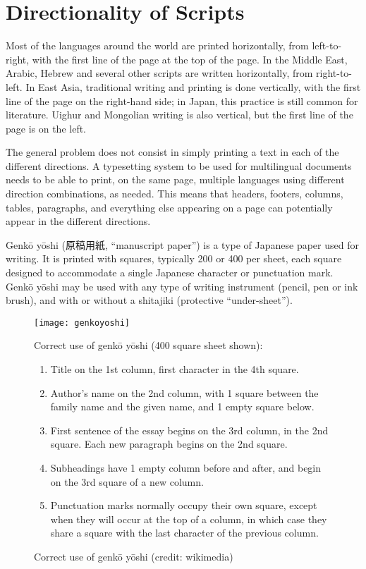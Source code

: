 \chapter{Directionality of Scripts}

Most of the languages around the world are printed horizontally, from left-to-right, with the first
line of the page at the top of the page. In the Middle East, Arabic, Hebrew and several other scripts are
written horizontally, from right-to-left. In East Asia, traditional writing and printing is done vertically,
with the first line of the page on the right-hand side; in Japan, this practice is still common for literature.
Uighur and Mongolian writing is also vertical, but the first line of the page is on the left.

The general problem does not consist in simply printing a text in each of the different directions.
A typesetting system to be used for multilingual documents needs to be able to print, on the same
page, multiple languages using different direction combinations, as needed. This means that headers,
footers, columns, tables, paragraphs, and everything else appearing on a page can potentially appear in
the different directions.

Genkō yōshi {\panunicode (原稿用紙}, \enquote{manuscript paper}) is a type of Japanese paper used for writing. It is printed with squares, typically 200 or 400 per sheet, each square designed to accommodate a single Japanese character or punctuation mark. Genkō yōshi may be used with any type of writing instrument (pencil, pen or ink brush), and with or without a shitajiki (protective \enquote{under-sheet}).

\begin{figure}[htbp]
\texttt{[image: genkoyoshi]}

\bgroup
\footnotesize
Correct use of genkō yōshi (400 square sheet shown):
\narrower\narrower
\begin{enumerate}
\item Title on the 1st column, first character in the 4th square.
\item Author's name on the 2nd column, with 1 square between the family name and the given name, and 1 empty square below.
\item First sentence of the essay begins on the 3rd column, in the 2nd square. Each new paragraph begins on the 2nd square.
\item Subheadings have 1 empty column before and after, and begin on the 3rd square of a new column.
\item Punctuation marks normally occupy their own square, except when they will occur at the top of a column, in which case they share a square with the last character of the previous column.
\end{enumerate}
\egroup

\caption{Correct use of genkō yōshi (credit: wikimedia)}
\end{figure}

